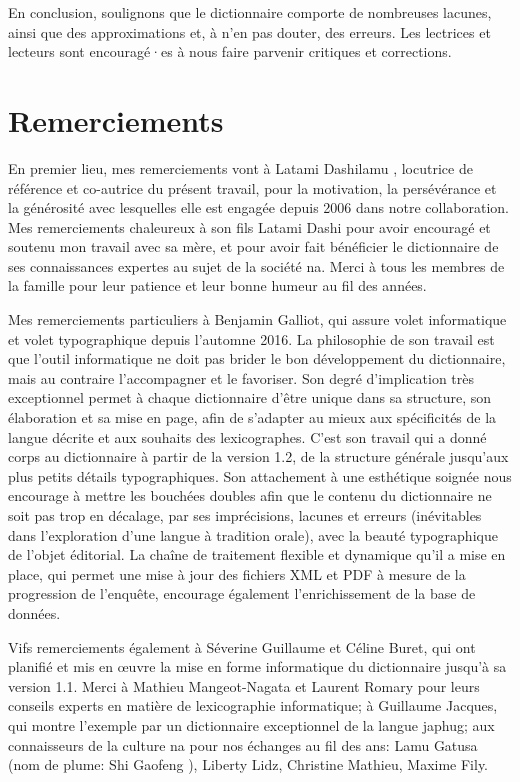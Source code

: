 En conclusion, soulignons que le dictionnaire comporte de nombreuses lacunes, ainsi que des approximations et, à n'en pas douter, des erreurs. Les lectrices et lecteurs sont encouragé·es à nous faire parvenir critiques et corrections.


\section{Remerciements}

En premier lieu, mes remerciements vont à Latami Dashilamu , locutrice de référence et co-autrice du présent travail, pour la motivation, la persévérance et la générosité avec lesquelles elle est engagée depuis 2006 dans notre collaboration. Mes remerciements chaleureux à son fils Latami Dashi  pour avoir encouragé et soutenu mon travail avec sa mère, et pour avoir fait bénéficier le dictionnaire de ses connaissances expertes au sujet de la société na. Merci à tous les membres de la famille pour leur patience et leur bonne humeur au fil des années.

Mes remerciements particuliers à Benjamin Galliot, qui assure volet informatique et volet typographique depuis l'automne 2016. La philosophie de son travail est que l'outil informatique ne doit pas brider le bon développement du dictionnaire, mais au contraire l'accompagner et le favoriser. Son degré d'implication très exceptionnel permet à chaque dictionnaire d'être unique dans sa structure, son élaboration et sa mise en page, afin de s’adapter au mieux aux spécificités de la langue décrite et aux souhaits des lexicographes. C'est son travail qui a donné corps au dictionnaire à partir de la version 1.2, de la structure générale jusqu'aux plus petits détails typographiques. Son attachement à une esthétique soignée nous encourage à mettre les bouchées doubles afin que le contenu du dictionnaire ne soit pas trop en décalage, par ses imprécisions, lacunes et erreurs (inévitables dans l'exploration d'une langue à tradition orale), avec la beauté typographique de l'objet éditorial. La chaîne de traitement flexible et dynamique qu'il a mise en place, qui permet une mise à jour des fichiers XML et PDF à mesure de la progression de l'enquête, encourage également l’enrichissement de la base de données.

Vifs remerciements également à Séverine Guillaume et Céline Buret, qui ont planifié et mis en œuvre la mise en forme informatique du dictionnaire jusqu'à sa version 1.1. Merci à Mathieu Mangeot-Nagata et Laurent Romary pour leurs conseils experts en matière de lexicographie informatique; à Guillaume Jacques, qui montre l’exemple par un dictionnaire exceptionnel de la langue japhug; aux connaisseurs de la culture na pour nos échanges au fil des ans: Lamu Gatusa  (nom de plume: Shi Gaofeng ), Liberty Lidz, Christine Mathieu, Maxime Fily.

